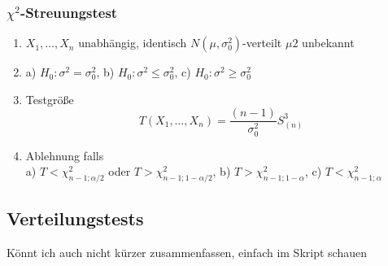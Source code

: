 \documentclass[
	ngerman,
	accentcolor=9c,%
	type=intern,
	marginpar=false
	]{tudapub}
\begin{document}
                \subsubsection*{$\chi^2$-Streuungstest}
                    \begin{enumerate}
                        \item $X_1,\dots,X_n$ unabhängig, identisch $N(\mu, \sigma^2_0)$-verteilt $\mu2$ unbekannt
                        \item a) $H_0: \sigma^2 = \sigma^2_0$, b) $H_0: \sigma^2 \leq \sigma^2_0$, c) $H_0: \sigma^2 \geq \sigma^2_0$
                        \item Testgröße
                        \begin{equation*}
                            T(X_1,\dots,X_n)=\dfrac{(n-1)}{\sigma^2_0}S^3_{(n)}
                        \end{equation*}
                        \item Ablehnung falls\\
                        a) $T<\chi^2_{n-1;\alpha/2}$ oder $T>\chi^2_{n-1;1-\alpha/2}$, 
                        b) $T>\chi^2_{n-1;1-\alpha}$, 
                        c) $T<\chi^2_{n-1;\alpha}$
                    \end{enumerate}
            \subsection{Verteilungstests}
                Könnt ich auch nicht kürzer zusammenfassen, einfach im Skript schauen
\end{document}
